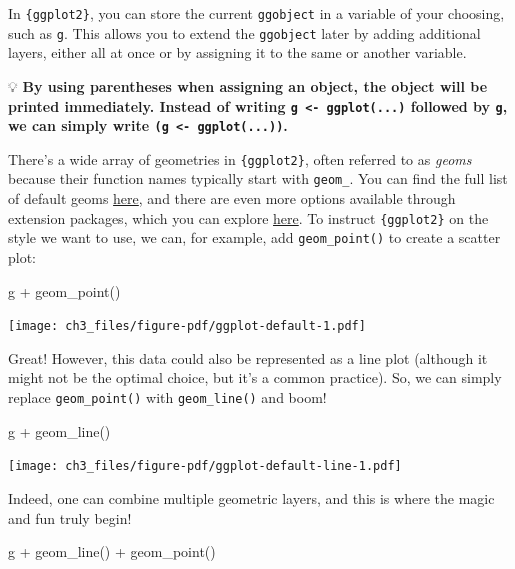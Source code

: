 \documentclass[
  letterpaper,
  DIV=11,
  numbers=noendperiod]{scrreprt}
\newenvironment{Shaded}{\begin{snugshade}}{\end{snugshade}}
\newcommand{\FunctionTok}[1]{\textcolor[rgb]{0.28,0.35,0.67}{#1}}
\newcommand{\NormalTok}[1]{\textcolor[rgb]{0.00,0.23,0.31}{#1}}
\newcommand{\SpecialCharTok}[1]{\textcolor[rgb]{0.37,0.37,0.37}{#1}}
\begin{document}
In \texttt{\{ggplot2\}}, you can store the current \texttt{ggobject} in
a variable of your choosing, such as \texttt{g}. This allows you to
extend the \texttt{ggobject} later by adding additional layers, either
all at once or by assigning it to the same or another variable.

💡 \textbf{By using parentheses when assigning an object, the object
will be printed immediately. Instead of writing
\texttt{g\ \textless{}-\ ggplot(...)} followed by \texttt{g}, we can
simply write \texttt{(g\ \textless{}-\ ggplot(...))}.}

There's a wide array of geometries in \texttt{\{ggplot2\}}, often
referred to as \emph{geoms} because their function names typically start
with \texttt{geom\_}. You can find the full list of default geoms
\href{https://ggplot2.tidyverse.org/reference/}{here}, and there are
even more options available through extension packages, which you can
explore \href{https://exts.ggplot2.tidyverse.org/}{here}. To instruct
\texttt{\{ggplot2\}} on the style we want to use, we can, for example,
add \texttt{geom\_point()} to create a scatter plot:

\begin{Shaded}
\begin{Highlighting}[]
\NormalTok{g }\SpecialCharTok{+} \FunctionTok{geom\_point}\NormalTok{()}
\end{Highlighting}
\end{Shaded}

\texttt{[image: ch3\_files/figure-pdf/ggplot-default-1.pdf]}

Great! However, this data could also be represented as a line plot
(although it might not be the optimal choice, but it's a common
practice). So, we can simply replace \texttt{geom\_point()} with
\texttt{geom\_line()} and boom!

\begin{Shaded}
\begin{Highlighting}[]
\NormalTok{g }\SpecialCharTok{+} \FunctionTok{geom\_line}\NormalTok{()}
\end{Highlighting}
\end{Shaded}

\texttt{[image: ch3\_files/figure-pdf/ggplot-default-line-1.pdf]}

Indeed, one can combine multiple geometric layers, and this is where the
magic and fun truly begin!

\begin{Shaded}
\begin{Highlighting}[]
\NormalTok{g }\SpecialCharTok{+} \FunctionTok{geom\_line}\NormalTok{() }\SpecialCharTok{+} \FunctionTok{geom\_point}\NormalTok{()}
\end{Highlighting}
\end{Shaded}
\end{document}
